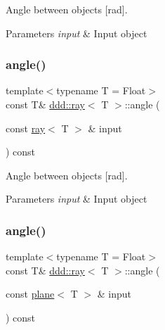 Angle between objects \mbox{[}rad\mbox{]}. 


\begin{DoxyParams}{Parameters}
{\em input} & Input object \\
\hline
\end{DoxyParams}
\mbox{\label{classddd_1_1ray_a2d95fa78240a0e66d36cff629e5a8e0b}} 
\subsubsection{\texorpdfstring{angle()}{angle()}\hspace{0.1cm}{\footnotesize\ttfamily [3/5]}}
{\footnotesize\ttfamily template$<$typename T = Float$>$ \\
const T\& \hyperlink{classddd_1_1ray}{ddd\+::ray}$<$ T $>$\+::angle (\begin{DoxyParamCaption}\item[{const \hyperlink{classddd_1_1ray}{ray}$<$ T $>$ \&}]{input }\end{DoxyParamCaption}) const\hspace{0.3cm}{\ttfamily [inline]}}



Angle between objects \mbox{[}rad\mbox{]}. 


\begin{DoxyParams}{Parameters}
{\em input} & Input object \\
\hline
\end{DoxyParams}
\mbox{\label{classddd_1_1ray_ac7fa512fde0e202a0f64463b12ea7e11}} 
\subsubsection{\texorpdfstring{angle()}{angle()}\hspace{0.1cm}{\footnotesize\ttfamily [4/5]}}
{\footnotesize\ttfamily template$<$typename T = Float$>$ \\
const T\& \hyperlink{classddd_1_1ray}{ddd\+::ray}$<$ T $>$\+::angle (\begin{DoxyParamCaption}\item[{const \hyperlink{classddd_1_1plane}{plane}$<$ T $>$ \&}]{input }\end{DoxyParamCaption}) const\hspace{0.3cm}{\ttfamily [inline]}}



